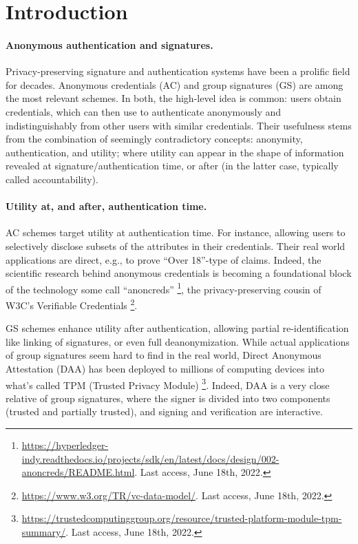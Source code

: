 \section{Introduction}
\label{sec:introduction}


\paragraph{Anonymous authentication and signatures.} %
Privacy-preserving signature and authentication systems have been a prolific
field for decades. Anonymous credentials (AC) \cite{chau85} and group signatures
(GS) \cite{ch91} are among the most relevant schemes. In both, the
high-level idea is common: users obtain credentials, which can then use to
authenticate anonymously and indistinguishably from other users with similar
credentials. 
%
Their usefulness stems from the combination of seemingly contradictory concepts:
anonymity, authentication, and utility; where utility can appear in the shape of
information revealed at signature/authentication time, or after (in the latter
case, typically called accountability).

\paragraph{Utility at, and after, authentication time.} %
AC schemes target utility at authentication time. For instance, allowing
users to selectively disclose subsets of the attributes in their credentials.
Their real world applications are direct, e.g., to prove ``Over 18''-type of
claims. Indeed, the scientific research behind anonymous credentials is becoming
a foundational block of the technology some call ``anoncreds''%
\footnote{\url{https://hyperledger-indy.readthedocs.io/projects/sdk/en/latest/docs/design/002-anoncreds/README.html}. Last access, June 18th, 2022.},
the privacy-preserving cousin of W3C's Verifiable Credentials%
\footnote{\url{https://www.w3.org/TR/vc-data-model/}. Last access, June 18th,
  2022.}.

GS schemes enhance utility after authentication, allowing partial
re-identification like linking of signatures, or even full deanonymization.
While actual applications of group signatures seem hard to find in the real
world, Direct Anonymous Attestation (DAA) \cite{bcc04,bl07,cdl16b} has been
deployed to millions of computing devices into what's called TPM (Trusted
Privacy Module)%
\footnote{\url{https://trustedcomputinggroup.org/resource/trusted-platform-module-tpm-summary/}. Last access, June 18th, 2022.}.
Indeed, DAA is a very close relative of group signatures, where the signer is
divided into two components (trusted and partially trusted), and signing
and verification are interactive.

